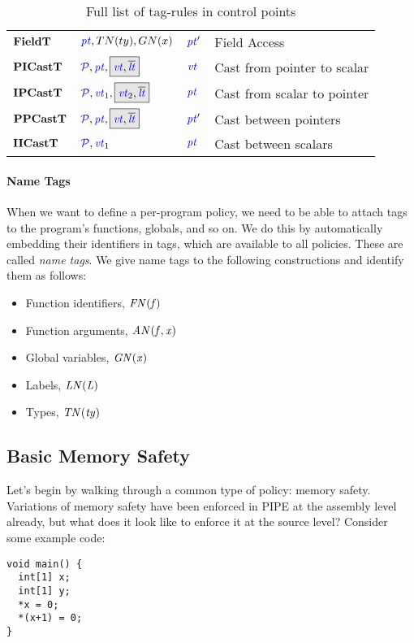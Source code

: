 \documentclass{llncs}
\begin{document}
\begin{table}[t]
\begin{tabular}{|l|l|l|l|}
    \(\mathbf{FieldT}\)     & \(\mathit{\color{blue} pt}, TN(ty), GN(x)\)        & \(\mathit{\color{blue} pt}'\)     & Field Access \\
    \(\mathbf{PICastT}\)    & \(\picasttargs\)       & \(\mathit{\color{blue} vt}\)    & Cast from pointer to scalar \\
    \(\mathbf{IPCastT}\)    & \(\ipcasttargs\)       & \(\mathit{\color{blue} pt}\)    & Cast from scalar to pointer \\
    \(\mathbf{PPCastT}\)    & \(\ppcasttargs\)       & \(\mathit{\color{blue} pt}'\)    & Cast between pointers \\
    \(\mathbf{IICastT}\)    & \(\mathcal{\color{blue} P}, \mathit{\color{blue} vt}_1\)       & \(\mathit{\color{blue} pt}\)    & Cast between scalars \\
    \hline
  \end{tabular}

  \caption{Full list of tag-rules in control points}
  \label{fig:controlpoints}
\end{table}

\paragraph*{Name Tags}

When we want to define a per-program policy, we need to be able to attach tags to the program's
functions, globals, and so on. We do this by automatically embedding their identifiers in tags,
which are available to all policies. These are called {\em name tags}. We give name tags to the
following constructions and identify them as follows:
\begin{itemize}
\item Function identifiers, \(\mathit{FN(f)}\)
\item Function arguments, \(\mathit{AN(f,x)}\)
\item Global variables, \(\mathit{GN(x)}\)
\item Labels, \(\mathit{LN(L)}\)
\item Types, \(\mathit{TN(ty)}\)
\end{itemize}

\subsection{Basic Memory Safety}
\label{sec:memsafe}

Let's begin by walking through a common type of policy: memory safety. Variations of memory safety
have been enforced in PIPE at the assembly level already, but what does it look like to enforce it
at the source level? Consider some example code:

\begin{verbatim}
void main() {
  int[1] x;
  int[1] y;
  *x = 0;
  *(x+1) = 0;
}
\end{verbatim}
\end{document}
